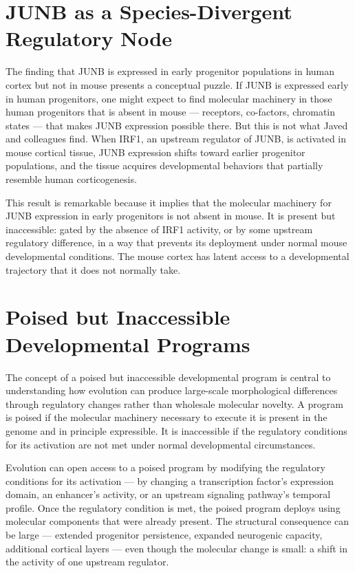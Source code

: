 \documentclass[12pt, a4paper, openany]{book}
\theoremstyle{definition}
\theoremstyle{remark}
\begin{document}
\section{JUNB as a Species-Divergent Regulatory Node}

The finding that JUNB is expressed in early progenitor populations in human cortex but not in mouse presents a conceptual puzzle. If JUNB is expressed early in human progenitors, one might expect to find molecular machinery in those human progenitors that is absent in mouse — receptors, co-factors, chromatin states — that makes JUNB expression possible there. But this is not what Javed and colleagues find. When IRF1, an upstream regulator of JUNB, is activated in mouse cortical tissue, JUNB expression shifts toward earlier progenitor populations, and the tissue acquires developmental behaviors that partially resemble human corticogenesis.

This result is remarkable because it implies that the molecular machinery for JUNB expression in early progenitors is not absent in mouse. It is present but inaccessible: gated by the absence of IRF1 activity, or by some upstream regulatory difference, in a way that prevents its deployment under normal mouse developmental conditions. The mouse cortex has latent access to a developmental trajectory that it does not normally take.

\section{Poised but Inaccessible Developmental Programs}

The concept of a poised but inaccessible developmental program is central to understanding how evolution can produce large-scale morphological differences through regulatory changes rather than wholesale molecular novelty. A program is poised if the molecular machinery necessary to execute it is present in the genome and in principle expressible. It is inaccessible if the regulatory conditions for its activation are not met under normal developmental circumstances.

Evolution can open access to a poised program by modifying the regulatory conditions for its activation — by changing a transcription factor's expression domain, an enhancer's activity, or an upstream signaling pathway's temporal profile. Once the regulatory condition is met, the poised program deploys using molecular components that were already present. The structural consequence can be large — extended progenitor persistence, expanded neurogenic capacity, additional cortical layers — even though the molecular change is small: a shift in the activity of one upstream regulator.
\end{document}
